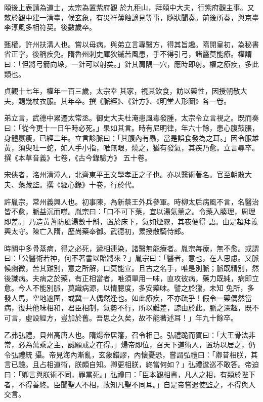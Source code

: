 \begin{pinyinscope}
 頤後上表請為道士，太宗為置紫府觀
 於九秬山，拜頤中大夫，行紫府觀主事。又敕於觀中建一清臺，候玄象，有災祥薄蝕謫見等事，隨狀聞奏。前後所奏，與京臺李淳風多相符契。後數歲卒。



 甄權，許州扶溝人也。嘗以母病，與弟立言專醫方，得其旨趣。隋開皇初，為秘書省正字，後稱疾免。隋魯州刺史庫狄鏚苦風患，手不得引弓，諸醫莫能療。權謂曰：「但將弓箭向垛，一針可以射矣。」針其肩隅一穴，應時即射。權之療疾，多此類也。



 貞觀十七年，權年一百三歲，太宗幸
 其家，視其飲食，訪以藥性，因授朝散大夫，賜幾杖衣服。其年卒。撰《脈經》、《針方》、《明堂人形圖》各一卷。



 弟立言，武德中累遷太常丞。御史大夫杜淹患風毒發腫，太宗令立言視之。既而奏曰：「從今更十一日午時必死。」果如其言。時有尼明律，年六十餘，患心腹鼓脹，身體嬴瘦，已經二年。立言診脈曰：「其腹內有蟲，當是誤食發為之耳。」因令服雄黃，須臾吐一蛇，如人手小指，唯無眼，燒之，猶有發氣，其疾乃愈。立言尋卒。撰《本草音義》七卷，《古今錄驗方》
 五十卷。



 宋俠者，洺州清漳人，北齊東平王文學孝正之子也。亦以醫術著名。官至朝散大夫、藥藏監。撰《經心錄》十卷，行於代。



 許胤宗，常州義興人也。初事陳，為新蔡王外兵參軍。時柳太后病風不言，名醫治皆不愈，脈益沉而噤。胤宗曰：「口不可下藥，宜以湯氣薰之。令藥入腠理，周理即差。」乃造黃蓍防風湯數十斛，置於床下，氣如煙霧，其夜便得
 語。由是超拜義興太守。陳亡入隋，歷尚藥奉御。武德初，累授散騎侍郎。



 時關中多骨蒸病，得之必死，遞相連染，諸醫無能療者。胤宗每療，無不愈。或謂曰：「公醫術若神，何不著書以貽將來？」胤宗曰：「醫者，意也，在人思慮。又脈候幽微，苦其難別，意之所解，口莫能宣。且古之名手，唯是別脈；脈既精別，然後識病。夫病之於藥，有正相當者，唯須單用一味，直攻彼病，藥力既純，病即立愈。今人不能別脈，莫識病源，以情臆度，多安藥味。譬之於獵，未知
 兔所，多發人馬，空地遮圍，或冀一人偶然逢也。如此療疾，不亦疏乎！假令一藥偶然當病，復共他味相和，君臣相制，氣勢不行，所以難差，諒由於此。脈之深趣，既不可言，虛設經方，豈加於舊。吾思之久矣，故不能著述耳！」年九十餘卒。



 乙弗弘禮，貝州高唐人也。隋煬帝居籓，召令相己。弘禮跪而賀曰：「大王骨法非常，必為萬乘之主，誠願戒之在得。」煬帝即位，召天下道術人，置坊以居之，仍令弘禮統
 攝。帝見海內漸亂，玄象錯謬，內懷憂恐，嘗謂弘禮曰：「卿昔相朕，其言已驗。且占相道術，朕頗自知。卿更相朕，終當何如？」弘禮逡巡不敢答。帝迫曰：「卿言與朕術不同，罪當死。」弘禮曰：「臣本觀相書，凡人之相，有類於陛下者，不得善終。臣聞聖人不相，故知凡聖不同耳。」自是帝嘗遣使監之，不得與人交言。




\end{pinyinscope}
